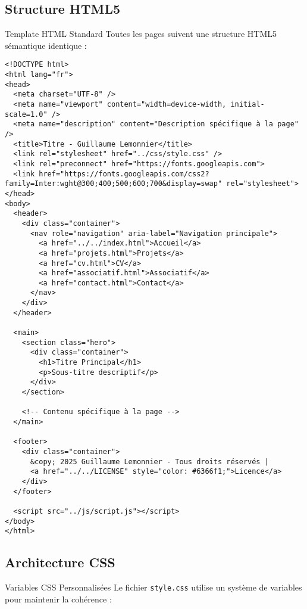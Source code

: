 \documentclass[12pt,a4paper]{article}
\begin{document}
\subsection{Structure HTML5}

\begin{yellowbox}{Template HTML Standard}
Toutes les pages suivent une structure HTML5 sémantique identique :
\end{yellowbox}

\begin{lstlisting}[style=htmlstyle, caption=Structure HTML type]
<!DOCTYPE html>
<html lang="fr">
<head>
  <meta charset="UTF-8" />
  <meta name="viewport" content="width=device-width, initial-scale=1.0" />
  <meta name="description" content="Description spécifique à la page" />
  <title>Titre - Guillaume Lemonnier</title>
  <link rel="stylesheet" href="../css/style.css" />
  <link rel="preconnect" href="https://fonts.googleapis.com">
  <link href="https://fonts.googleapis.com/css2?family=Inter:wght@300;400;500;600;700&display=swap" rel="stylesheet">
</head>
<body>
  <header>
    <div class="container">
      <nav role="navigation" aria-label="Navigation principale">
        <a href="../../index.html">Accueil</a>
        <a href="projets.html">Projets</a>
        <a href="cv.html">CV</a>
        <a href="associatif.html">Associatif</a>
        <a href="contact.html">Contact</a>
      </nav>
    </div>
  </header>

  <main>
    <section class="hero">
      <div class="container">
        <h1>Titre Principal</h1>
        <p>Sous-titre descriptif</p>
      </div>
    </section>
    
    <!-- Contenu spécifique à la page -->
  </main>

  <footer>
    <div class="container">
      &copy; 2025 Guillaume Lemonnier - Tous droits réservés | 
      <a href="../../LICENSE" style="color: #6366f1;">Licence</a>
    </div>
  </footer>

  <script src="../js/script.js"></script>
</body>
</html>
\end{lstlisting}

\subsection{Architecture CSS}

\begin{bluebox}{Variables CSS Personnalisées}
Le fichier \texttt{style.css} utilise un système de variables pour maintenir la cohérence :
\end{bluebox}
\end{document}
